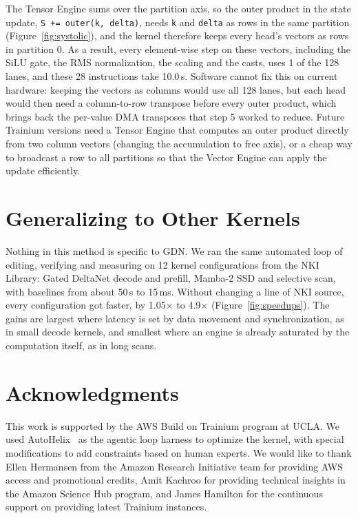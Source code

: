 \documentclass{article}
\newcommand{\us}{\,\textmu{}s\xspace}
\newcommand{\code}[1]{\texttt{#1}}
\begin{document}
The Tensor Engine sums over the partition axis, so the outer product in the state update, \code{S += outer(k, delta)}, needs \code{k} and \code{delta} as rows in the same partition (Figure~\ref{fig:systolic}), and the kernel therefore keeps every head's vectors as rows in partition 0. As a result, every element-wise step on these vectors, including the SiLU gate, the RMS normalization, the scaling and the casts, uses 1 of the 128 lanes, and these 28 instructions take 10.0\us. Software cannot fix this on current hardware: keeping the vectors as columns would use all 128 lanes, but each head would then need a column-to-row transpose before every outer product, which brings back the per-value DMA transposes that step 5 worked to reduce. Future Trainium versions need a Tensor Engine that computes an outer product directly from two column vectors (changing the accumulation to free axis), or a cheap way to broadcast a row to all partitions so that the Vector Engine can apply the update efficiently.

\section{Generalizing to Other Kernels}
\label{sec:general}

Nothing in this method is specific to GDN. We ran the same automated loop of editing, verifying and measuring on 12 kernel configurations from the NKI Library: Gated DeltaNet decode and prefill, Mamba-2 SSD and selective scan, with baselines from about 50\us to 15\,ms. Without changing a line of NKI source, every configuration got faster, by 1.05$\times$ to 4.9$\times$ (Figure~\ref{fig:speedups}). The gains are largest where latency is set by data movement and synchronization, as in small decode kernels, and smallest where an engine is already saturated by the computation itself, as in long scans.

\section*{Acknowledgments}

This work is supported by the AWS Build on Trainium program at UCLA. We used AutoHelix~\citep{autohelix} as the agentic loop harness to optimize the kernel, with special modifications to add constraints based on human experts. We would like to thank Ellen Hermansen from the Amazon Research Initiative team for providing AWS access and promotional credits, Amit Kachroo for providing technical insights in the Amazon Science Hub program, and James Hamilton for the continuous support on providing latest Trainium instances.



\end{document}
